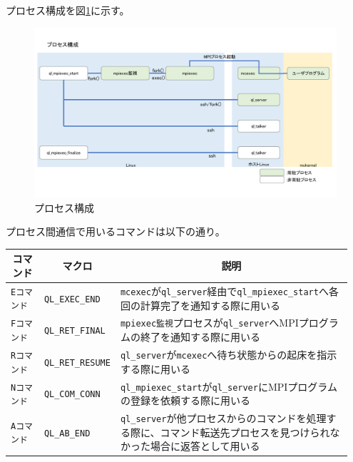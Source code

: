 \documentclass[twoside,11pt,fleqn]{book}
\begin{document}
プロセス構成を図\ref{fig:ProcessDiagram}に示す。
\begin{figure}[!ht]
\centering
\includegraphics[width=0.95\linewidth]{figs/ProcessDiagram.pdf}
\vspace{-0em}\caption{プロセス構成}
\label{fig:ProcessDiagram}
\vspace{-0em}
\end{figure}
\FloatBarrier

プロセス間通信で用いるコマンドは以下の通り。
\begin{table}[!ht]
\footnotesize
\begin{tabular}{|p{0.10\linewidth}|p{0.15\linewidth}|p{0.70\linewidth}|} \hline
\multicolumn{1}{|c}{\textbf{コマンド}}&\multicolumn{1}{|c|}{\textbf{ マクロ}}&\multicolumn{1}{c|}{\textbf{説明}}\\ \hline 
 \hline
\texttt{Eコマンド}&\texttt{QL\_EXEC\_END}&\texttt{mcexec}が\texttt{ql\_server}経由で\texttt{ql\_mpiexec\_start}へ各回の計算完了を通知する際に用いる\\ \hline
\texttt{Fコマンド}&\texttt{QL\_RET\_FINAL}&\texttt{mpiexec監視}プロセスが\texttt{ql\_server}へMPIプログラムの終了を通知する際に用いる\\ \hline
\texttt{Rコマンド}&\texttt{QL\_RET\_RESUME}&\texttt{ql\_server}が\texttt{mcexec}へ待ち状態からの起床を指示する際に用いる\\ \hline
\texttt{Nコマンド}&\texttt{QL\_COM\_CONN}&\texttt{ql\_mpiexec\_start}が\texttt{ql\_server}にMPIプログラムの登録を依頼する際に用いる\\ \hline
\texttt{Aコマンド}&\texttt{QL\_AB\_END}&\texttt{ql\_server}が他プロセスからのコマンドを処理する際に、コマンド転送先プロセスを見つけられなかった場合に返答として用いる\\ \hline
\end{tabular}
\vspace{-0em}
\end{table}
\FloatBarrier
\end{document}
